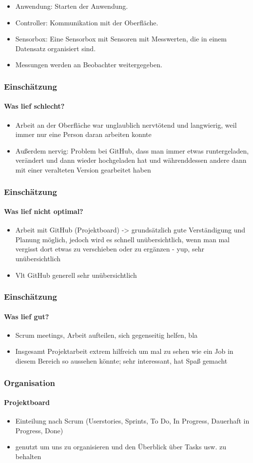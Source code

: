 \documentclass[notes]{beamer}
\begin{document}
	\note
	{
		\begin{itemize}
			\item Anwendung: Starten der Anwendung. 
			\item Controller: Kommunikation mit der Oberfläche. 
			\item Sensorbox: Eine Sensorbox mit Sensoren mit Messwerten, die in einem Datensatz organisiert sind. 
			\item Messungen werden an Beobachter weitergegeben.
		\end{itemize}
	}
	\begin{frame}
		\frametitle{Einschätzung}
		\framesubtitle{Was lief schlecht?}
		\begin{itemize}
			\item Arbeit an der Oberfläche war unglaublich nervtötend und langwierig, weil immer nur eine Person daran arbeiten konnte 
			\item Außerdem nervig: Problem bei GitHub, dass man immer etwas runtergeladen, verändert und dann wieder hochgeladen hat und währenddessen andere dann mit einer veralteten Version gearbeitet haben 
		\end{itemize}
	\end{frame}
	\begin{frame}
		\frametitle{Einschätzung}
		\framesubtitle{Was lief nicht optimal?}
		\begin{itemize}
			\item Arbeit mit GitHub (Projektboard) -> grundsätzlich gute Verständigung und Planung möglich, jedoch wird es schnell unübersichtlich, wenn man mal vergisst dort etwas zu verschieben oder zu ergänzen - yup, sehr unübersichtlich 
			\item Vlt GitHub generell sehr unübersichtlich 
		\end{itemize}
	\end{frame}
	\begin{frame}
		\frametitle{Einschätzung}
		\framesubtitle{Was lief gut?}
		\begin{itemize}
			\item Scrum meetings, Arbeit aufteilen, sich gegenseitig helfen, bla 
			\item Insgesamt Projektarbeit extrem hilfreich um mal zu sehen wie ein Job in diesem Bereich so aussehen könnte; sehr interessant, hat Spaß gemacht 
		\end{itemize}
	\end{frame}
	\begin{frame}
		\frametitle{Organisation}
		\framesubtitle{Projektboard}
		\begin{itemize}
			\item Einteilung nach Scrum (Userstories, Sprints, To Do, In Progress, Dauerhaft in Progress, Done) 
			\item genutzt um uns zu organisieren und den Überblick über Tasks usw. zu behalten 
		\end{itemize}
	\end{frame}
\end{document}
